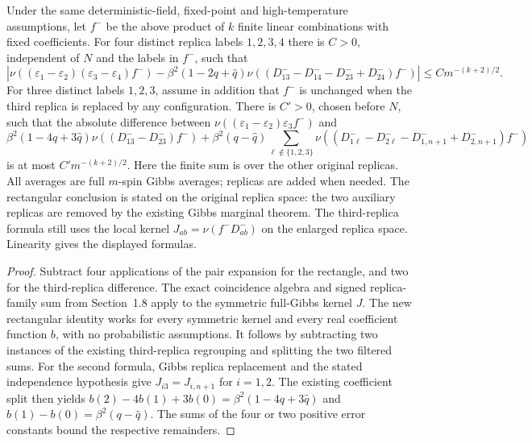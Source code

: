 \begin{corollary}
\label{cor:sg-tal:cavity-higher-rect-third}
\leanok
{}
Under the same deterministic-field, fixed-point and high-temperature assumptions, let $f^-$
be the above product of $k$ finite linear combinations with fixed coefficients.
For four distinct replica labels $1,2,3,4$ there is $C>0$, independent of $N$ and the
labels in $f^-$, such that
\[
 \left|\nu((\varepsilon_1-\varepsilon_2)(\varepsilon_3-\varepsilon_4)f^-)
 -\beta^2(1-2q+\widehat q)
   \nu((D^-_{13}-D^-_{14}-D^-_{23}+D^-_{24})f^-)\right|
 \le C m^{-(k+2)/2}.
\]
For three distinct labels $1,2,3$, assume in addition that $f^-$ is unchanged when the
third replica is replaced by any configuration. There is $C'>0$, chosen before $N$,
such that the absolute difference between $\nu((\varepsilon_1-\varepsilon_2)\varepsilon_3f^-)$
and
\[
 \beta^2(1-4q+3\widehat q)\nu((D^-_{13}-D^-_{23})f^-)
 +\beta^2(q-\widehat q)\sum_{\ell\notin\{1,2,3\}}
   \nu((D^-_{1\ell}-D^-_{2\ell}-D^-_{1,n+1}+D^-_{2,n+1})f^-)
\]
is at most $C'm^{-(k+2)/2}$. Here the finite sum is over the other original replicas.
All averages are full $m$-spin Gibbs averages; replicas are added when needed.
The rectangular conclusion is stated on the original replica space: the two auxiliary
replicas are removed by the existing Gibbs marginal theorem. The third-replica formula
still uses the local kernel $J_{ab}=\nu(f^-D^-_{ab})$ on the enlarged replica space.
Linearity gives the displayed formulas.
\end{corollary}
\begin{proof}
\leanok
Subtract four applications of the pair expansion for the rectangle, and two for the
third-replica difference. The exact coincidence algebra and signed replica-family sum
from Section~1.8 apply to the symmetric full-Gibbs kernel $J$.
The new rectangular identity works for every symmetric kernel and every real coefficient
function $b$, with no probabilistic assumptions. It follows by subtracting two instances
of the existing third-replica regrouping and splitting the two filtered sums.
For the second formula, Gibbs replica replacement and the stated independence hypothesis
give $J_{i3}=J_{i,n+1}$ for $i=1,2$. The existing coefficient split then yields
$b(2)-4b(1)+3b(0)=\beta^2(1-4q+3\widehat q)$ and
$b(1)-b(0)=\beta^2(q-\widehat q)$. The sums of the four or two positive error constants
bound the respective remainders.
\end{proof}

